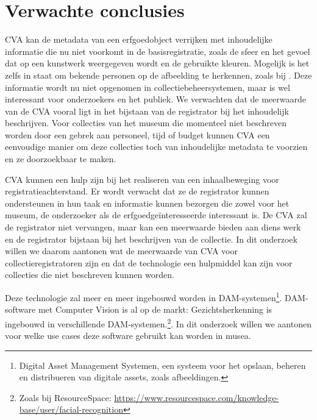 \section{Verwachte conclusies}

CVA kan de metadata van een erfgoedobject verrijken met inhoudelijke informatie die nu niet voorkomt in de basisregistratie, zoals de sfeer en het gevoel dat op een kunstwerk weergegeven wordt en de gebruikte kleuren. Mogelijk is het zelfs in staat om bekende personen op de afbeelding te herkennen, zoals bij \textcite{Hindle2017}. Deze informatie wordt nu niet opgenomen in collectiebeheersystemen, maar is wel interessant voor onderzoekers en het publiek. We verwachten dat de meerwaarde van de CVA vooral ligt in het bijstaan van de registrator bij het inhoudelijk beschrijven. Voor collecties van het museum die momenteel niet beschreven worden door een gebrek aan personeel, tijd of budget kunnen CVA een eenvoudige manier om deze collecties toch van inhoudelijke metadata te voorzien en ze doorzoekbaar te maken.

CVA kunnen een hulp zijn bij het realiseren van een inhaalbeweging voor registratieachterstand. Er wordt verwacht dat ze de registrator kunnen ondersteunen in hun taak en informatie kunnen bezorgen die zowel voor het museum, de onderzoeker als de erfgoedge{\"i}nteresseerde interessant is. De CVA zal de registrator niet vervangen, maar kan een meerwaarde bieden aan diens werk en de registrator bijstaan bij het beschrijven van de collectie. In dit onderzoek willen we daarom aantonen wat de meerwaarde van CVA voor collectieregistratoren zijn en dat de technologie een hulpmiddel kan zijn voor collecties die niet beschreven kunnen worden.

Deze technologie zal meer en meer ingebouwd worden in DAM-systemen\footnote{Digital Asset Management Systemen, een systeem voor het opslaan, beheren en distribueren van digitale assets, zoals afbeeldingen.}. DAM-software met Computer Vision is al op de markt: Gezichtsherkenning is ingebouwd in verschillende DAM-systemen.\footnote{Zoals bij ResourceSpace: \url{https://www.resourcespace.com/knowledge-base/user/facial-recognition}}. In dit onderzoek willen we aantonen voor welke use cases deze software gebruikt kan worden in musea.